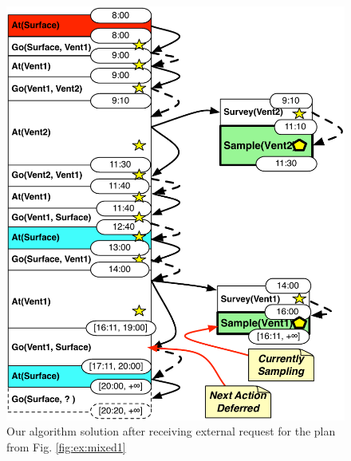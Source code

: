 \begin{figure}
  \centering
  \includegraphics[width=0.8\columnwidth]{figs/example_MixedUpdate}
  \caption{Our algorithm solution after receiving external request for the plan from Fig. \ref{fig:ex:mixed1}}
  \label{fig:ex:mixed2}
\end{figure}



